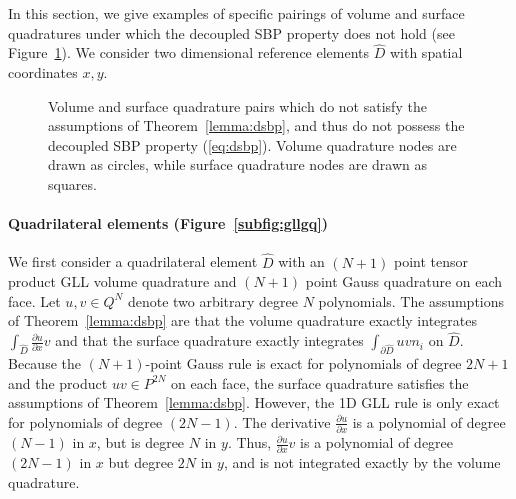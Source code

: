 \documentclass{svjour3}                     %
\renewcommand{\hat}{\widehat}
\newcommand{\pd}[2]{\frac{\partial#1}{\partial#2}}
\begin{document}
In this section, we give examples of specific pairings of volume and surface quadratures under which the decoupled SBP property does not hold (see Figure~\ref{fig:sbploss}).  We consider two dimensional reference elements $\hat{D}$ with spatial coordinates $x,y$.
\begin{figure}
\centering
{}
\hspace{2em}
\caption{Volume and surface quadrature pairs which do not satisfy the assumptions of Theorem~\ref{lemma:dsbp}, and thus do not possess the decoupled SBP property (\ref{eq:dsbp}). Volume quadrature nodes are drawn as circles, while surface quadrature nodes are drawn as squares.}
\label{fig:sbploss}
\end{figure}

\paragraph{Quadrilateral elements (Figure~\ref{subfig:gllgq})} We first consider a quadrilateral element $\hat{D}$ with an $(N+1)$ point tensor product GLL volume quadrature and $(N+1)$ point Gauss quadrature on each face.  Let $u,v \in Q^N$ denote two arbitrary degree $N$ polynomials.  The assumptions of Theorem~\ref{lemma:dsbp} are that the volume quadrature exactly integrates $\int_{\hat{D}} \pd{u}{x} v$ and that the surface quadrature exactly integrates $\int_{\partial \hat{D}} u v n_i$ on $\hat{D}$.  Because the $(N+1)$-point Gauss rule is exact for polynomials of degree $2N+1$ and the product $uv \in P^{2N}$ on each face, the surface quadrature satisfies the assumptions of Theorem~\ref{lemma:dsbp}.  However, the 1D GLL rule is only exact for polynomials of degree $(2N-1)$.  The derivative $\pd{u}{x}$ is a polynomial of degree $(N-1)$ in $x$, but is degree $N$ in $y$.  Thus, $\pd{u}{x}v$ is a polynomial of degree $(2N-1)$ in $x$ but degree $2N$ in $y$, and is not integrated exactly by the volume quadrature.  
\end{document}
